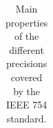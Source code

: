 \begin{table}[H]
\begin{tabular}{| r | c | c | c |}
    \end{tabular}                                                       
    \caption{Main properties of the different precisions covered by the IEEE 754 standard.}
    \label{tab:properties}
\end{table}










%            
%            

